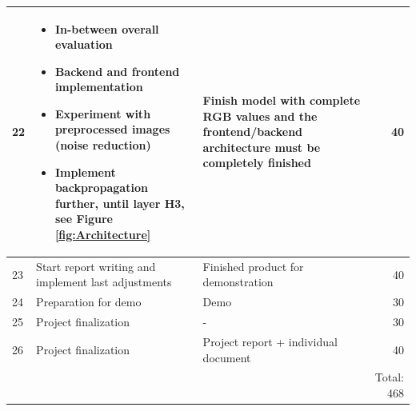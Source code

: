 \documentclass[a4paper,onecolumn]{report}
\begin{document}
\begin{center}
\begin{tabular}{| l | p{5cm}| p{5cm} | r | }
	22 & \begin{itemize} \vspace{-1.75em}
	\item In-between overall evaluation \vspace{-1em}
	\item Backend and frontend implementation\vspace{-1em}
	\item Experiment with preprocessed images (noise reduction) \vspace{-1em}
	\item Implement backpropagation further, until layer H3, see Figure \ref{fig:Architecture} \vspace{-1em}
	\end{itemize} & Finish model with complete RGB values and the frontend/backend architecture must be completely finished & 40 					\\  \hline
	23 & Start report writing and implement last adjustments & Finished product for demonstration & 40 	\\	\hline
	24 & Preparation for demo & Demo & 30				\\  \hline
    25 & Project finalization & - & 30 				\\ \hline
    26 & Project finalization & Project report + individual document & 40 \\ \hline
       & & & Total: 468  \\ \hline

    \hline
  \end{tabular}
\end{center}



\end{document}
